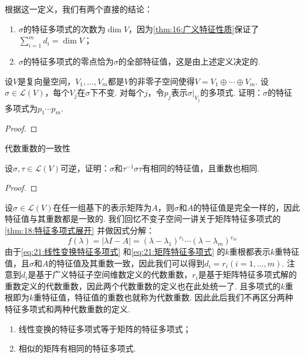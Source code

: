 根据这一定义，我们有两个直接的结论：
\begin{enumerate}
    \item $\sigma$的特征多项式的次数为$\dim V$，因为\autoref{thm:16:广义特征性质}保证了$\displaystyle\sum_{i=1}^m d_i=\dim V$；

    \item $\sigma$的特征多项式的零点恰为$\sigma$的全部特征值，这是由上述定义决定的.
\end{enumerate}

\begin{example}
    设$V$是复向量空间，$V_1,\ldots,V_m$都是$V$的非零子空间使得$V=V_1\oplus\cdots\oplus V_m$. 设$\sigma\in \mathcal{L}(V)$，每个$V_j$在$\sigma$下不变. 对每个$j$，令$p_j$表示$\sigma|_{V_j}$的多项式. 证明：$\sigma$的特征多项式为$p_1\cdots p_m$.
\end{example}

\begin{proof}

\end{proof}

代数重数的一致性

\begin{example}
    设$\sigma,\tau\in \mathcal{L}(V)$可逆，证明：$\sigma$和$\tau^{-1}\sigma\tau$有相同的特征值，且重数也相同.
\end{example}

\begin{proof}

\end{proof}

设$\sigma\in\mathcal{L}(V)$在任一组基下的表示矩阵为$A$，则$\sigma$和$A$的特征值是完全一样的，因此特征值与其重数都是一致的. 我们回忆不变子空间一讲关于矩阵特征多项式的\autoref{thm:18:特征多项式展开} 并做因式分解：
\begin{equation}\label{eq:21:矩阵特征多项式}
    f(\lambda)=|\lambda I-A|=(\lambda-\lambda_1)^{r_1}\cdots(\lambda-\lambda_m)^{r_m}
\end{equation}
由于\autoref{eq:21:线性变换特征多项式} 和\autoref{eq:21:矩阵特征多项式} 的$k$重根都表示$k$重特征值，且$\sigma$和$A$的特征值及其重数一致，因此我们可以得到$d_i=r_i(i=1,\ldots,m)$. 注意到$d_i$是基于广义特征子空间维数定义的代数重数，$r_i$是基于矩阵特征多项式解的重数定义的代数重数，因此两个代数重数的定义也在此处统一了. 且多项式的$k$重根即为$k$重特征值，特征值的重数也就称为代数重数. 因此此后我们不再区分两种特征多项式和两种代数重数的定义.

\begin{corollary}
    \begin{enumerate}
        \item 线性变换的特征多项式等于矩阵的特征多项式；
        \item 相似的矩阵有相同的特征多项式.
    \end{enumerate}
\end{corollary}


